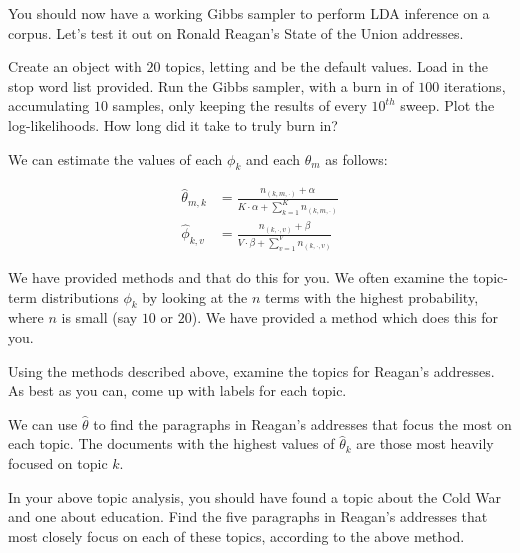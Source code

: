 You should now have a working Gibbs sampler to perform LDA inference on a corpus. Let's test it out on Ronald Reagan's State of the Union addresses.

\begin{problem}
Create an  object with $20$ topics, letting  and  be the default values. Load in the stop word list provided. Run the Gibbs sampler, with a burn in of $100$ iterations, accumulating $10$ samples, only keeping the results of every $10^{th}$ sweep. Plot the log-likelihoods. How long did it take to truly burn in?
\end{problem}

We can estimate the values of each $\phi_{k}$ and each $\theta_{m}$ as follows:

\begin{align*}
\widehat{\theta}_{m,k} & = \frac{n_{(k,m,\cdot)} + \alpha}{K \cdot \alpha + \sum_{k=1}^{K} n_{(k,m,\cdot)}} \\
\widehat{\phi}_{k,v} & = \frac{n_{(k,\cdot,v)} + \beta}{V \cdot \beta + \sum_{v=1}^{V} n_{(k,\cdot,v)}}
\end{align*}

We have provided methods  and  that do this for you. We often examine the topic-term distributions $\phi_{k}$ by looking at the $n$ terms with the highest probability, where $n$ is small (say $10$ or $20$).  We have provided a method  which does this for you.

\begin{problem}
Using the methods described above, examine the topics for Reagan's addresses. As best as you can, come up with labels for each topic.
\end{problem}

We can use $\widehat{\theta}$ to find the paragraphs in Reagan's addresses that focus the most on each topic. The documents with the highest values of $\widehat{\theta}_{k}$ are those most heavily focused on topic $k$.

\begin{problem}
In your above topic analysis, you should have found a topic about the Cold War and one about education. Find the five paragraphs in Reagan's addresses that most closely focus on each of these topics, according to the above method.
\end{problem}
